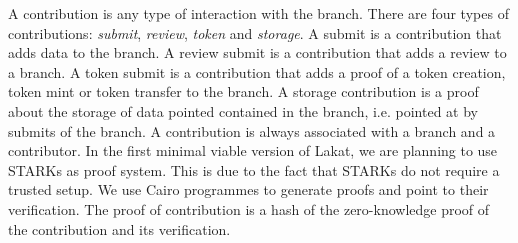 A contribution is any type of interaction with the branch. There are four types of contributions: \textit{submit}, \textit{review}, \textit{token} and \textit{storage}. A submit is a contribution that adds data to the branch. A review submit is a contribution that adds a review to a branch. A token submit is a contribution that adds a proof of a token creation, token mint or token transfer to the branch. A storage contribution is a proof about the storage of data pointed contained in the branch, i.e. pointed at by submits of the branch. A contribution is always associated with a branch and a contributor. In the first minimal viable version of Lakat, we are planning to use STARKs \cite{} as proof system. This is due to the fact that STARKs do not require a trusted setup. We use Cairo programmes to generate proofs and point to their verification. The proof of contribution is a hash of the zero-knowledge proof of the contribution and its verification.
